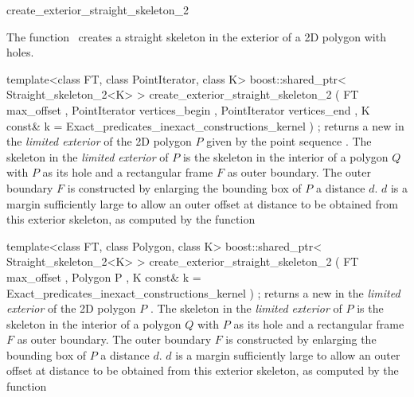 

\begin{ccRefFunction}{create_exterior_straight_skeleton_2}


\ccDefinition

The function \ccRefName\ creates a straight skeleton in the exterior of a 2D polygon with holes.


\ccFunction
{template<class FT, class PointIterator, class K>
boost::shared_ptr< Straight_skeleton_2<K> >
create_exterior_straight_skeleton_2 
  ( FT            max_offset
  , PointIterator vertices_begin
  , PointIterator vertices_end
  , K const&      k = Exact_predicates_inexact_constructions_kernel
  ) ;
}
{returns a new  in the {\em limited exterior} of the 2D polygon $P$ given by the point sequence .
The skeleton in the {\em limited exterior} of $P$ is the skeleton in the interior of a polygon $Q$ with $P$ as its hole and a rectangular frame $F$ as outer boundary.
The outer boundary $F$ is constructed by enlarging the bounding box of $P$ a distance $d$. 
$d$ is a margin sufficiently large to allow an outer offset at distance  to be obtained from this exterior skeleton, as computed by the function  
}

\ccFunction
{template<class FT, class Polygon, class K>
boost::shared_ptr< Straight_skeleton_2<K> >
create_exterior_straight_skeleton_2 ( FT       max_offset
                                    , Polygon  P
                                    , K const& k = Exact_predicates_inexact_constructions_kernel
                                    ) ;
}
{returns a new  in the {\em limited exterior} of the 2D polygon $P$ .
The skeleton in the {\em limited exterior} of $P$ is the skeleton in the interior of a polygon $Q$ with $P$ as its hole and a rectangular frame $F$ as outer boundary.
The outer boundary $F$ is constructed by enlarging the bounding box of $P$ a distance $d$. 
$d$ is a margin sufficiently large to allow an outer offset at distance  to be obtained from this exterior skeleton, as computed by the function  
}


\end{ccRefFunction}
